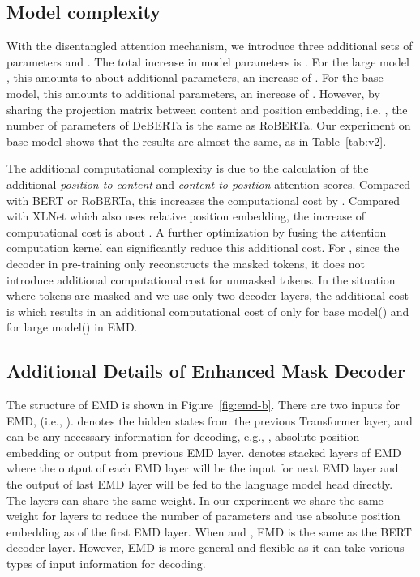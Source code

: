 \documentclass{article}
\begin{document}
\subsection{Model complexity}
With the disentangled attention mechanism, we introduce three additional sets of parameters  and . The total increase in model parameters is . For the large model , this amounts to about  additional parameters, an increase of . 
For the base model, this amounts to  additional parameters, an increase of . 
However, by sharing the projection matrix between content and position embedding, i.e.  , the number of parameters of DeBERTa is the same as RoBERTa. 
Our experiment on base model shows that the results are almost the same, as in Table~\ref{tab:v2}. 




The additional computational complexity is  due to the calculation of the additional \textit{position-to-content} and \textit{content-to-position} attention scores. 
Compared with BERT or RoBERTa, this increases the computational cost by . 
Compared with XLNet which also uses relative position embedding, the increase of computational cost is about . 
A further optimization by fusing the attention computation kernel can significantly reduce this additional cost. 
For , since the decoder in pre-training only reconstructs the masked tokens, it does not introduce additional computational cost for unmasked tokens. 
In the situation where  tokens are masked and we use only two decoder layers, 
the additional cost is  which results in an additional computational cost of only  for base model() and  for large model() in EMD. 


\subsection{Additional Details of Enhanced Mask Decoder}

The structure of EMD is shown in Figure~\ref{fig:emd-b}. There are two inputs for EMD, (i.e., ).  
 denotes the hidden states from the previous Transformer layer, and  can be any necessary information for decoding, e.g., , absolute position embedding or output from previous EMD layer. 
 denotes  stacked layers of EMD where the output of each EMD layer will be the input  for next EMD layer and the output of last EMD layer will be fed to the language model head directly. 
The  layers can share the same weight. 
In our experiment we share the same weight for  layers to reduce the number of parameters and use absolute position embedding as  of the first EMD layer. 
When  and , EMD is the same as the BERT decoder layer. 
However, EMD is more general and flexible as it can take various types of input information for decoding.
\end{document}
